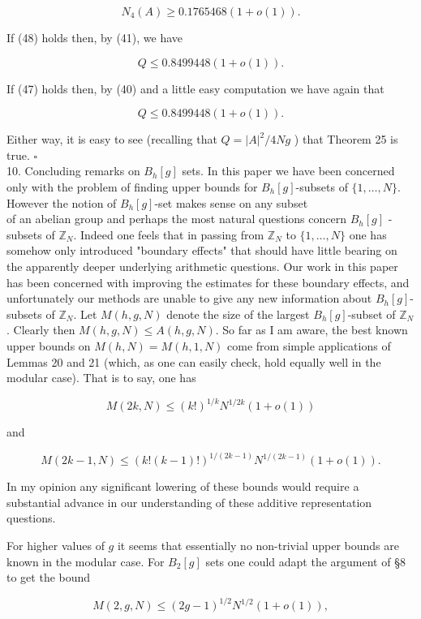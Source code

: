 \documentclass[10pt]{article}
\begin{document}
\begin{equation*}
N_{4}(A) \geq 0.1765468(1+o(1)) . \tag{48}
\end{equation*}


If (48) holds then, by (41), we have

$$
Q \leq 0.8499448(1+o(1)) .
$$

If (47) holds then, by (40) and a little easy computation we have again that

$$
Q \leq 0.8499448(1+o(1)) .
$$

Either way, it is easy to see (recalling that $Q=|A|^{2} / 4 N g$ ) that Theorem 25 is true. \(\square\)\\
10. Concluding remarks on $B_{h}[g]$ sets. In this paper we have been concerned only with the problem of finding upper bounds for $B_{h}[g]$-subsets of $\{1, \ldots, N\}$. However the notion of $B_{h}[g]$-set makes sense on any subset\\
of an abelian group and perhaps the most natural questions concern $B_{h}[g]$ -subsets of $\mathbb{Z}_{N}$. Indeed one feels that in passing from $\mathbb{Z}_{N}$ to $\{1, \ldots, N\}$ one has somehow only introduced "boundary effects" that should have little bearing on the apparently deeper underlying arithmetic questions. Our work in this paper has been concerned with improving the estimates for these boundary effects, and unfortunately our methods are unable to give any new information about $B_{h}[g]$-subsets of $\mathbb{Z}_{N}$. Let $M(h, g, N)$ denote the size of the largest $B_{h}[g]$-subset of $\mathbb{Z}_{N}$. Clearly then $M(h, g, N) \leq A(h, g, N)$. So far as I am aware, the best known upper bounds on $M(h, N)=M(h, 1, N)$ come from simple applications of Lemmas 20 and 21 (which, as one can easily check, hold equally well in the modular case). That is to say, one has

$$
M(2 k, N) \leq(k!)^{1 / k} N^{1 / 2 k}(1+o(1))
$$

and

$$
M(2 k-1, N) \leq(k!(k-1)!)^{1 /(2 k-1)} N^{1 /(2 k-1)}(1+o(1)) .
$$

In my opinion any significant lowering of these bounds would require a substantial advance in our understanding of these additive representation questions.

For higher values of $g$ it seems that essentially no non-trivial upper bounds are known in the modular case. For $B_{2}[g]$ sets one could adapt the argument of §8 to get the bound

$$
M(2, g, N) \leq(2 g-1)^{1 / 2} N^{1 / 2}(1+o(1)),
$$
\end{document}
